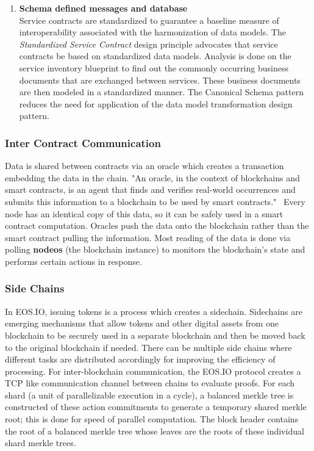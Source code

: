 \documentclass[]{article}
\begin{document}
{\begin{enumerate}
	\item \textbf{Schema defined messages and database} \\
	Service contracts are standardized to guarantee a baseline measure of interoperability associated with the harmonization of data models.
	The \textit{Standardized Service Contract} design principle advocates that service contracts be based on standardized data models. 
	Analysis is done on the service inventory blueprint to find out the commonly occurring business documents that are exchanged between services. 
	These business documents are then modeled in a standardized manner. 
	The Canonical Schema pattern reduces the need for application of the data model transformation design pattern.
	\cite{1}
	
		
\end{enumerate}
	 
	\subsubsection{Inter Contract Communication}
	Data is shared between contracts via an oracle which creates a transaction embedding the data in the chain. 
	"An oracle, in the context of blockchains and smart contracts, is an agent that finds and verifies real-world occurrences 
	and submits this information to a blockchain to be used by smart contracts."\ 
	\cite{2}
	Every node has an identical copy of this data, so it can be safely used in a smart contract computation.
	Oracles push the data onto the blockchain rather than the smart contract pulling the information.
	Most reading of the data is done via polling \textbf{nodeos} (the blockchain instance) to monitors the blockchain's state 
	and performs certain actions in response. 
	
	
	\subsubsection{Side Chains}
	In EOS.IO, issuing tokens is a process which creates a sidechain. 
	Sidechains are emerging mechanisms that allow tokens and other digital assets from one blockchain 
	to be securely used in a separate blockchain and then be moved back to the original blockchain if needed. 
	There can be multiple side chains where different tasks are distributed accordingly for improving the efficiency of processing. 	
	For inter-blockchain communication, the EOS.IO protocol creates a TCP like communication channel between chains to evaluate proofs.
	For each shard (a unit of parallelizable execution in a cycle), a balanced merkle tree is constructed of these action commitments 
	to generate a temporary shared merkle root; 
	this is done for speed of parallel computation. 
	The block header contains the root of a balanced merkle tree whose leaves are the roots of these individual shard merkle trees.
	\cite{3} 

}
\end{document}
